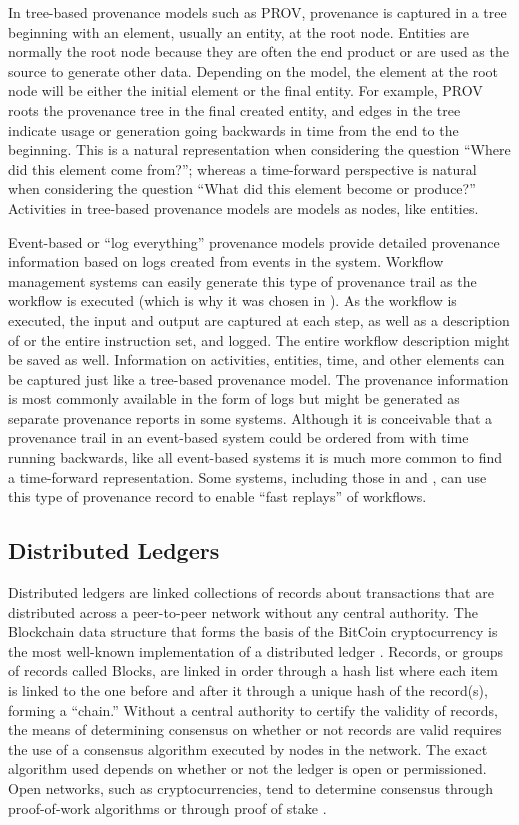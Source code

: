 \documentclass[sigconf]{acmart}
\begin{document}
In tree-based provenance models such as PROV, provenance is captured in a tree beginning with an element, usually an entity, at the root node. Entities are normally the root node because they are often the end product or are used as the source to generate other data. Depending on the model, the element at the root node will be either the initial element or the final entity. For example, PROV roots the provenance tree in the final created entity, and edges in the tree indicate usage or generation going backwards in time from the end to the beginning. This is a natural representation when considering the question ``Where did this element come from?''; whereas a time-forward perspective is natural when considering the question ``What did this element become or produce?'' Activities in tree-based provenance models are models as nodes, like entities.

Event-based or ``log everything'' provenance models provide detailed provenance information based on logs created from events in the system. Workflow management systems can easily generate this type of provenance trail as the workflow is executed (which is why it was chosen in \cite{billings_eclipse_2017}). As the workflow is executed, the input and output are captured at each step, as well as a description of or the entire instruction set, and logged. The entire workflow description might be saved as well. Information on activities, entities, time, and other elements can be captured just like a tree-based provenance model. The provenance information is most commonly available in the form of logs but might be generated as separate provenance reports in some systems. Although it is conceivable that a provenance trail in an event-based system could be ordered from with time running backwards, like all event-based systems it is much more common to find a time-forward representation. Some systems, including those in \cite{billings_eclipse_2017} and \cite{altintas_provenance_2006}, can use this type of provenance record to enable ``fast replays'' of workflows.

\subsection{Distributed Ledgers}
Distributed ledgers are linked collections of records about transactions that are distributed across a peer-to-peer network without any central authority. The Blockchain data structure that forms the basis of the BitCoin cryptocurrency is the most well-known implementation of a distributed ledger \cite{nakamoto_bitcoin:_nodate}. Records, or groups of records called Blocks, are linked in order through a hash list where each item is linked to the one before and after it through a unique hash of the record(s), forming a ``chain.'' Without a central authority to certify the validity of records, the means of determining consensus on whether or not records are valid requires the use of a consensus algorithm executed by nodes in the network. The exact algorithm used depends on whether or not the ledger is open or permissioned. Open networks, such as cryptocurrencies, tend to determine consensus through proof-of-work algorithms \cite{nakamoto_bitcoin:_nodate} or through proof of stake \cite{noauthor_proof--stake_2018}.
\end{document}
